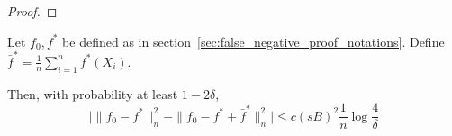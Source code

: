 \begin{proof}

\end{proof}



\begin{lemma}
\label{lem:remove_centering}

Let $f_0, f^*$ be defined as in section~\ref{sec:false_negative_proof_notations}. Define $\bar{f}^* = \frac{1}{n} \sum_{i=1}^n f^*(X_i)$.

Then, with probability at least $1 - 2\delta$,
\[
\Big | \| f_0 - f^* \|_n^2 - \| f_0 - f^* + \bar{f}^* \|_n^2 \Big| \leq
    c (sB)^2 \frac{1}{n} \log \frac{4}{\delta}
\]
\end{lemma}

